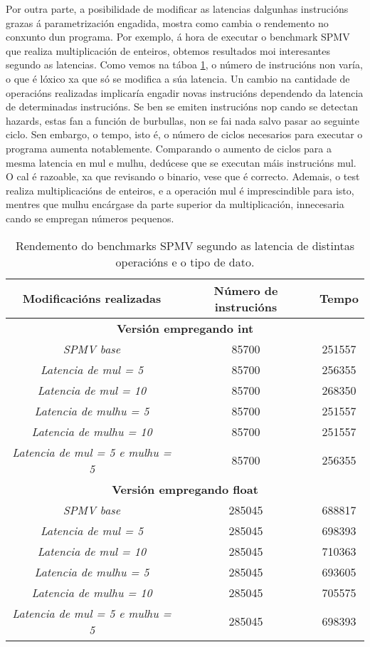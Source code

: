 Por outra parte, a posibilidade de modificar as latencias dalgunhas instrucións grazas á parametrización engadida, mostra como cambia o rendemento no conxunto dun programa. Por exemplo, á hora de executar o benchmark SPMV que realiza multiplicación de enteiros, obtemos resultados moi interesantes segundo as latencias. Como vemos na táboa \ref{tab:rendemento_spmv}, o número de instrucións non varía, o que é lóxico xa que só se modifica a súa latencia. Un cambio na cantidade de operacións realizadas implicaría engadir novas instrucións dependendo da latencia de determinadas instrucións. Se ben se emiten instrucións \acrshort{nop} cando se detectan hazards, estas fan a función de burbullas, non se fai nada salvo pasar ao seguinte ciclo. Sen embargo, o tempo, isto é, o número de ciclos necesarios para executar o programa aumenta notablemente. Comparando o aumento de ciclos para a mesma latencia en mul e mulhu, dedúcese que se executan máis instrucións mul. O cal é razoable, xa que revisando o binario, vese que é correcto. Ademais, o test realiza multiplicacións de enteiros, e a operación mul é imprescindible para isto, mentres que mulhu encárgase da parte superior da multiplicación, innecesaria cando se empregan números pequenos.

\begin{table}[hp!]
    \centering
    \begin{tabular}{c|c|c}
    \rowcolor{udcpink!25}
    \textbf{Modificacións realizadas} & \textbf{Número de instrucións}  & \textbf{Tempo} 
    \\\hline
    \multicolumn{3}{c}{\textbf{Versión empregando int}} \\
    \textit{SPMV base} & 85700 & 251557 \\
    \textit{Latencia de mul = 5} & 85700 & 256355\\
    \textit{Latencia de mul = 10} & 85700 & 268350\\
     \textit{Latencia de mulhu = 5} & 85700 & 251557\\ %
    \textit{Latencia de mulhu = 10} & 85700 & 251557\\ 
    \textit{Latencia de mul = 5 e mulhu = 5} & 85700 & 256355\\
    
    \multicolumn{3}{c}{\textbf{Versión empregando float}} \\
    \textit{SPMV base} & 285045 & 688817 \\
    \textit{Latencia de mul = 5} & 285045 & 698393\\
    \textit{Latencia de mul = 10} & 285045 & 710363\\
     \textit{Latencia de mulhu = 5} & 285045 & 693605\\ 
    \textit{Latencia de mulhu = 10} & 285045 & 705575\\ 
    \textit{Latencia de mul = 5 e mulhu = 5} & 285045 & 698393\\
    \end{tabular}
    \caption{Rendemento do benchmarks SPMV segundo as latencia de distintas operacións e o tipo de dato.}
    \label{tab:rendemento_spmv}
\end{table}

